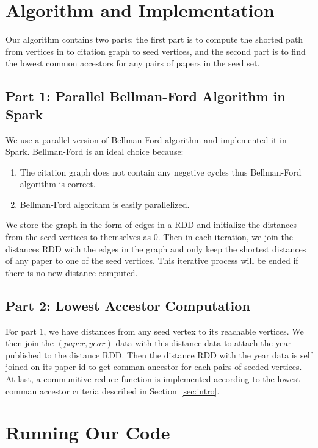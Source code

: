 \documentclass{article}
\begin{document}
\section{Algorithm and Implementation}
Our algorithm contains two parts: the first part is to compute the shorted path
from vertices in to citation graph to seed vertices, and the second part is to 
find the lowest common accestors for any pairs of papers in the seed set.

\subsection{Part 1: Parallel Bellman-Ford Algorithm in Spark}
We use a parallel version of Bellman-Ford algorithm and implemented it in
Spark. Bellman-Ford is an ideal choice because: 

\begin{enumerate}
    \item The citation graph does not contain any negetive cycles 
    thus Bellman-Ford algorithm is correct.
    \item Bellman-Ford algorithm is easily parallelized.
\end{enumerate}

We store the graph in the form of edges in a RDD and initialize the distances
from the seed vertices to themselves as $0$. Then in each iteration, we join
the distances RDD with the edges in the graph and only keep the shortest
distances of any paper to one of the seed vertices. This iterative process will
be ended if there is no new distance computed.

\subsection{Part 2: Lowest Accestor Computation}
For part 1, we have distances from any seed vertex to its reachable vertices. 
We then join the $(paper, year)$ data with this distance data to attach the 
year published to the distance RDD. Then the distance RDD with the year data 
is self joined on its paper id to get comman ancestor for each pairs of seeded 
vertices. At last, a communitive reduce function is implemented according to
the lowest comman accestor criteria described in Section~\ref{sec:intro}.

\section{Running Our Code}
\end{document}
